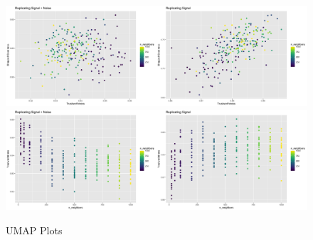 \documentclass[unnumsec,webpdf,modern,large,namedate]{oup-authoring-template}
\theoremstyle{thmstyleone}%
\theoremstyle{thmstyletwo}%
\theoremstyle{thmstylethree}%
\begin{document}
\begin{figure}[t]
\centering
\includegraphics[scale=0.22]{umap plot}
\includegraphics[scale=0.22]{trust plot (umap)}
\caption{UMAP Plots}
\end{figure}
\end{document}
